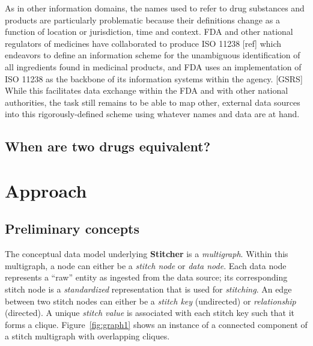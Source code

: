 \documentclass{bioinfo}
\newcommand\st{\textbf{Stitcher}}
\begin{document}
As in other information domains, the names used to refer to drug
substances and products are particularly problematic because their
definitions change as a function of location or jurisdiction, time and
context. FDA and other national regulators of medicines have
collaborated to produce ISO 11238 [ref] which endeavors to define an
information scheme for the unambiguous identification of all
ingredients found in medicinal products, and FDA uses an
implementation of ISO 11238 as the backbone of its information systems
within the agency. [GSRS] While this facilitates data exchange within
the FDA and with other national authorities, the task still remains to
be able to map other, external data sources into this
rigorously-defined scheme using whatever names and data are at hand. 

\subsection{When are two drugs equivalent?}


\section{Approach}

\subsection{Preliminary concepts}
The conceptual data model underlying \st{} is a \emph{multigraph}.
Within this multigraph, a node can either be a \emph{stitch node}
or \emph{data node}. Each data node represents a ``raw'' entity as
ingested from the data source; its corresponding stitch node is
a \emph{standardized} representation that is used
for \emph{stitching}. An edge between two stitch nodes can either be
a \emph{stitch key} (undirected) or \emph{relationship} (directed). A
unique \emph{stitch value} is associated with each stitch key such
that it forms a clique. Figure~\ref{fig:graph1} shows an instance of a
connected component of a stitch multigraph with overlapping cliques. 
\end{document}
